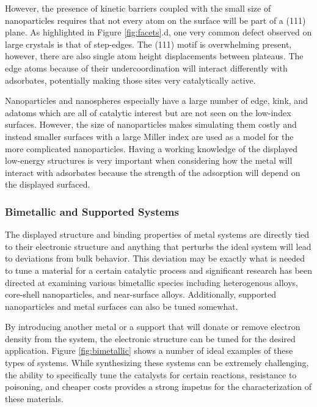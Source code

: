 However, the presence of kinetic barriers coupled with the small size of
nanoparticles requires that not every atom on the surface will be part of a
(111) plane. As highlighted in Figure \ref{fig:facets}.d, one very common
defect observed on large crystals is that of step-edges. The (111) motif is
overwhelming present, however, there are also single atom height displacements
between plateaus. The edge atoms because of their undercoordination will
interact differently with adsorbates, potentially making those sites very
catalytically active. 

Nanoparticles and nanospheres especially have a large number of edge, kink, and
adatoms which are all of catalytic interest but are not seen on the low-index
surfaces.  However, the size of nanoparticles makes simulating them costly and
instead smaller surfaces with a large Miller index are used as a model for the
more complicated nanoparticles. Having a working knowledge of the displayed
low-energy structures is very important when considering how the metal will
interact with adsorbates because the strength of the adsorption will depend on
the displayed surfaced.


\subsubsection{Bimetallic and Supported Systems}
The displayed structure and binding properties of metal systems are directly
tied to their electronic structure and anything that perturbs the ideal system
will lead to deviations from bulk behavior. This deviation may be exactly what
is needed to tune a material for a certain catalytic process and significant
research has been directed at examining various bimetallic species including
heterogenous alloys, core-shell nanoparticles, and near-surface alloys.
Additionally, supported nanoparticles and metal surfaces can also be tuned
somewhat. 

By introducing another metal or a support that will donate or remove electron
density from the system, the electronic structure can be tuned for the desired
application. Figure \ref{fig:bimetallic} shows a number of ideal examples of
these types of systems. While synthesizing these systems can be extremely
challenging, the ability to specifically tune the catalysts for certain
reactions, resistance to poisoning\citep{Sharma:0ly, Yu:2013fr}, and cheaper
costs\citep{Li:0hl, Zhao:0qf} provides a strong impetus for the characterization
of these materials.

